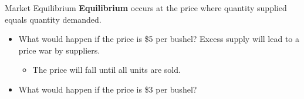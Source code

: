 \documentclass[12pt,t]{beamer}
\begin{document}
\begin{frame}{Market Equilibrium}
  \textbf{Equilibrium} occurs at the price where quantity supplied equals quantity demanded. 

  \begin{itemize}
    \item What would happen if the price is \$5 per bushel? Excess supply will lead to a price war by suppliers.
      \begin{itemize}
        \item The price will fall until all units are sold.
      \end{itemize}

    \pause 
    \item What would happen if the price is \$3 per bushel?
  \end{itemize}
\end{frame}
\end{document}
